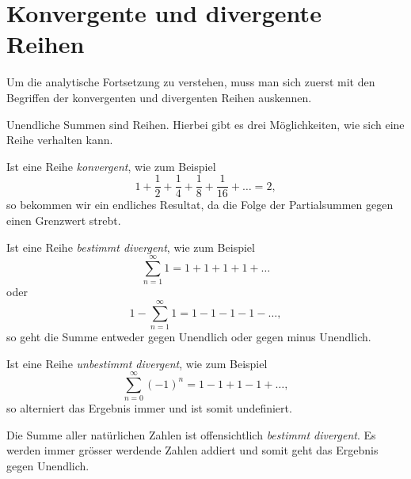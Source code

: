 %
%
%
%

\section{Konvergente und divergente Reihen
\label{konvergente-und-divergente-reihen}}

Um die analytische Fortsetzung zu verstehen, muss man sich zuerst mit den Begriffen der konvergenten und divergenten Reihen auskennen.

Unendliche Summen sind Reihen.
Hierbei gibt es drei Möglichkeiten, wie sich eine Reihe verhalten kann.

Ist eine Reihe \emph{konvergent}, wie zum Beispiel
%
\[
1 + \frac{1}{2} + \frac{1}{4} + \frac{1}{8} + \frac{1}{16} + \ldots = 2,
\]
so bekommen wir ein endliches Resultat, da die Folge der Partialsummen gegen einen Grenzwert strebt. 
%

Ist eine Reihe \emph{bestimmt divergent}, wie zum Beispiel
\[
\sum_{n=1}^{\infty} 1 = 1 + 1 + 1 + 1 + \ldots
\]
oder
\[
1 - \sum_{n=1}^{\infty} 1 = 1 - 1 - 1 - 1 - \ldots,
\]
so geht die Summe entweder gegen Unendlich oder gegen minus Unendlich.

Ist eine Reihe \emph{unbestimmt divergent}, wie zum Beispiel
%
%
\[
\sum_{n=0}^{\infty} (-1)^n = 1 - 1 + 1 - 1 + \ldots,
\]
so alterniert das Ergebnis immer und ist somit undefiniert.

Die Summe aller natürlichen Zahlen ist offensichtlich \emph{bestimmt divergent}.
%
%
Es werden immer grösser werdende Zahlen addiert und somit geht das Ergebnis gegen Unendlich.


